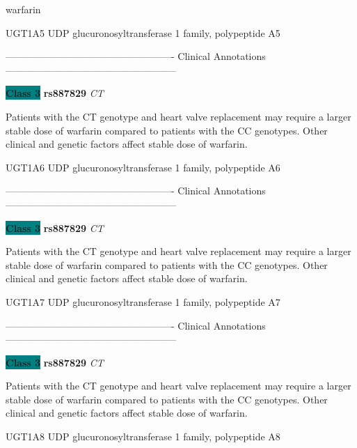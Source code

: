 \documentclass{resume} %
\begin{document}
\begin{rSection}{ warfarin }
\begin{rSubsection}{ UGT1A5 }{ UDP glucuronosyltransferase 1 family, polypeptide A5 }{}{}
\item[] ---------------------------------------------------- Clinical Annotations -----------------------------------------------------\newline
\item \textbf{\colorbox{teal} {Class 3}} \textbf{ rs887829 } \textit{ CT }
\item[] Patients with the CT genotype and heart valve replacement may require a larger stable dose of warfarin compared to patients with the CC genotypes. Other clinical and genetic factors affect stable dose of warfarin.
\end{rSubsection}\begin{rSubsection}{ UGT1A6 }{ UDP glucuronosyltransferase 1 family, polypeptide A6 }{}{}
\item[]

\item[] ---------------------------------------------------- Clinical Annotations -----------------------------------------------------\newline
\item \textbf{\colorbox{teal} {Class 3}} \textbf{ rs887829 } \textit{ CT }
\item[] Patients with the CT genotype and heart valve replacement may require a larger stable dose of warfarin compared to patients with the CC genotypes. Other clinical and genetic factors affect stable dose of warfarin.
\end{rSubsection}\begin{rSubsection}{ UGT1A7 }{ UDP glucuronosyltransferase 1 family, polypeptide A7 }{}{}
\item[]

\item[] ---------------------------------------------------- Clinical Annotations -----------------------------------------------------\newline
\item \textbf{\colorbox{teal} {Class 3}} \textbf{ rs887829 } \textit{ CT }
\item[] Patients with the CT genotype and heart valve replacement may require a larger stable dose of warfarin compared to patients with the CC genotypes. Other clinical and genetic factors affect stable dose of warfarin.
\end{rSubsection}\begin{rSubsection}{ UGT1A8 }{ UDP glucuronosyltransferase 1 family, polypeptide A8 }{}{}
\item[]


\end{rSubsection}
\end{rSection}
\end{document}

